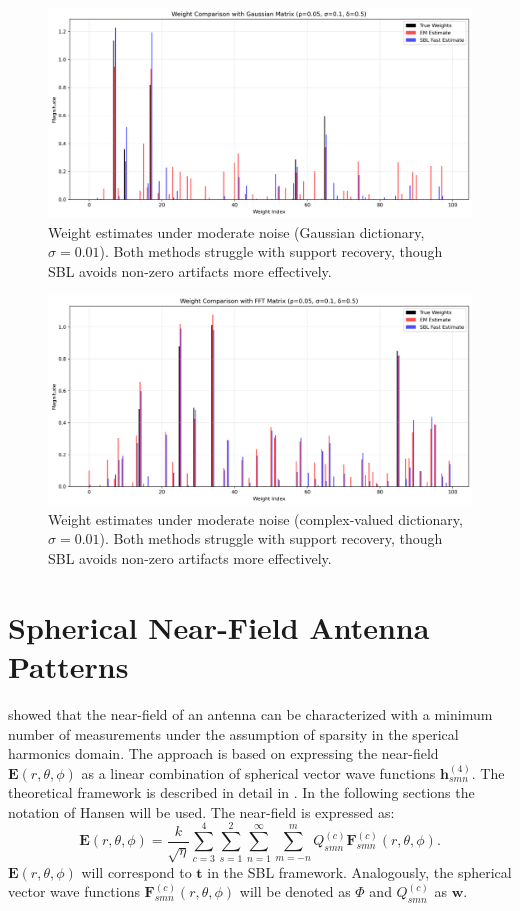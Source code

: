 \documentclass{article}
\begin{document}
\begin{figure}[H]
    \centering
    \includegraphics[width=0.75\linewidth]{Figures/weight_comparison_Gaussian_simga0.1.png}
    \caption{Weight estimates under moderate noise (Gaussian dictionary, $\sigma=0.01$). Both methods struggle with support recovery, though SBL avoids non-zero artifacts more effectively.}
    \label{fig:weight001Gauss}
\end{figure}
\begin{figure}[H]
    \centering
    \includegraphics[width=0.75\linewidth]{Figures/weight_comparison_FFT_simga0.1.png}
    \caption{Weight estimates under moderate noise (complex-valued dictionary, $\sigma=0.01$). Both methods struggle with support recovery, though SBL avoids non-zero artifacts more effectively.}
    \label{fig:weight001FFT}
\end{figure}

\section{Spherical Near-Field Antenna Patterns}
\citet{Hofmann2019minimum} showed that the near-field of an antenna can be characterized with a minimum number of measurements under the assumption of sparsity in the sperical harmonics domain. The approach is based on expressing the near-field \(\mathbf{E}(r,\theta,\phi)\) as a linear combination of spherical vector wave functions \(\mathbf{h}_{smn}^{(4)}\). The theoretical framework is described in detail in \citet{hansen1988spherical}. In the following sections the notation of Hansen will be used. The near-field is expressed as:
\begin{equation}
    \mathbf{E}(r,\theta,\phi) = \frac{k}{\sqrt{\eta}}\sum_{c=3}^4\sum_{s=1}^2 \sum_{n=1}^\infty \sum_{m=-n}^m Q_{smn}^{(c)} \mathbf{F}_{smn}^{(c)}(r,\theta,\phi).
\end{equation}
\(\mathbf{E}(r,\theta,\phi)\) will correspond to \(\mathbf{t}\) in the SBL framework. Analogously, the spherical vector wave functions \(\mathbf{F}_{smn}^{(c)}(r,\theta,\phi)\) will be denoted as \(\Phi\) and \(Q_{smn}^{(c)}\) as \(\mathbf{w}\).
\end{document}
